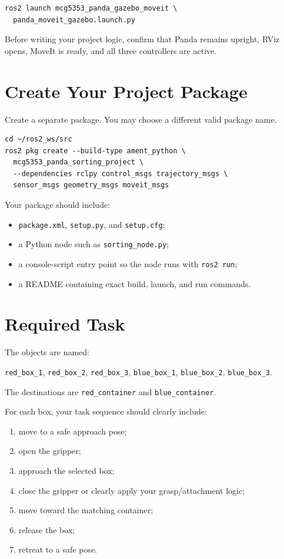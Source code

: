 \documentclass[11pt]{article}
\begin{document}
\begin{Verbatim}[fontsize=\small]
ros2 launch mcg5353_panda_gazebo_moveit \
  panda_moveit_gazebo.launch.py
\end{Verbatim}

Before writing your project logic, confirm that Panda remains upright, RViz
opens, MoveIt is ready, and all three controllers are active.

\section*{Create Your Project Package}

Create a separate package. You may choose a different valid package name.

\begin{Verbatim}[fontsize=\small]
cd ~/ros2_ws/src
ros2 pkg create --build-type ament_python \
  mcg5353_panda_sorting_project \
  --dependencies rclpy control_msgs trajectory_msgs \
  sensor_msgs geometry_msgs moveit_msgs
\end{Verbatim}

Your package should include:

\begin{itemize}
  \item \texttt{package.xml}, \texttt{setup.py}, and \texttt{setup.cfg};
  \item a Python node such as \texttt{sorting\_node.py};
  \item a console-script entry point so the node runs with \texttt{ros2 run};
  \item a README containing exact build, launch, and run commands.
\end{itemize}

\section*{Required Task}

The objects are named:

\begin{center}
\texttt{red\_box\_1}, \texttt{red\_box\_2}, \texttt{red\_box\_3},
\texttt{blue\_box\_1}, \texttt{blue\_box\_2}, \texttt{blue\_box\_3}.
\end{center}

The destinations are \texttt{red\_container} and \texttt{blue\_container}.

For each box, your task sequence should clearly include:

\begin{enumerate}[leftmargin=2em]
  \item move to a safe approach pose;
  \item open the gripper;
  \item approach the selected box;
  \item close the gripper or clearly apply your grasp/attachment logic;
  \item move toward the matching container;
  \item release the box;
  \item retreat to a safe pose.
\end{enumerate}
\end{document}
